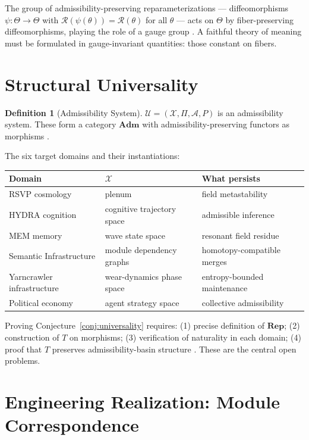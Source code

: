 \documentclass[12pt, a4paper]{article}
\theoremstyle{rsvpstyle}
\theoremstyle{definition}
\newtheorem{definition}[theorem]{Definition}
\newcommand{\Traj}{\mathcal{X}}
\newcommand{\Adm}{\mathcal{A}}
\newcommand{\ProjFam}{\Pi}
\newcommand{\Persist}{P}
\newcommand{\Real}{\mathcal{R}}
\begin{document}
The group of admissibility-preserving reparameterizations --- diffeomorphisms
$\psi : \Theta \to \Theta$ with $\Real(\psi(\theta)) = \Real(\theta)$ for all
$\theta$ --- acts on $\Theta$ by fiber-preserving diffeomorphisms, playing
the role of a gauge group \citep{BottTu1982}. A faithful theory of meaning must
be formulated in gauge-invariant quantities: those constant on fibers.

\section{Structural Universality}

\begin{definition}[Admissibility System]
$\mathcal{U} = (\Traj, \ProjFam, \Adm, \Persist)$ is an admissibility system.
These form a category $\mathbf{Adm}$ with admissibility-preserving functors
as morphisms \citep{MacLane1998}.
\end{definition}

The six target domains and their instantiations:

\begin{center}
\begin{tabular}{lll}
\toprule
\textbf{Domain} & $\Traj$ & \textbf{What persists} \\
\midrule
RSVP cosmology & plenum & field metastability \\
HYDRA cognition & cognitive trajectory space & admissible inference \\
MEM\textbar8 memory & wave state space & resonant field residue \\
Semantic Infrastructure & module dependency graphs & homotopy-compatible merges \\
Yarncrawler infrastructure & wear-dynamics phase space & entropy-bounded maintenance \\
Political economy & agent strategy space & collective admissibility \\
\bottomrule
\end{tabular}
\end{center}

Proving Conjecture~\ref{conj:universality} requires: (1) precise definition
of $\mathbf{Rep}$; (2) construction of $T$ on morphisms; (3) verification of
naturality in each domain; (4) proof that $T$ preserves admissibility-basin
structure \citep{EilenbergMacLane1945,MacLane1998}. These are the central
open problems.

\section{Engineering Realization: Module Correspondence}
\end{document}
